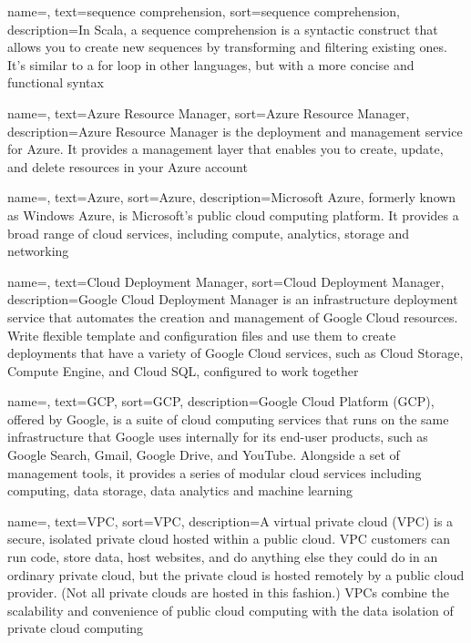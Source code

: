 {
    name=,
    text=sequence comprehension,
    sort=sequence comprehension,
    description={In Scala, a sequence comprehension is a syntactic construct that allows you to create new sequences by transforming and filtering existing ones. It's similar to a for loop in other languages, but with a more concise and functional syntax }
}

{
    name=,
    text=Azure Resource Manager,
    sort=Azure Resource Manager,
    description={Azure Resource Manager is the deployment and management service for Azure. It provides a management layer that enables you to create, update, and delete resources in your Azure account
    }
}

{
    name=,
    text=Azure,
    sort=Azure,
    description={Microsoft Azure, formerly known as Windows Azure, is Microsoft's public cloud computing platform. It provides a broad range of cloud services, including compute, analytics, storage and networking}
}

{
    name=,
    text=Cloud Deployment Manager,
    sort=Cloud Deployment Manager,
    description={Google Cloud Deployment Manager is an infrastructure deployment service that automates the creation and management of Google Cloud resources. Write flexible template and configuration files and use them to create deployments that have a variety of Google Cloud services, such as Cloud Storage, Compute Engine, and Cloud SQL, configured to work together}
}

{
    name=,
    text=GCP,
    sort=GCP,
    description={Google Cloud Platform (GCP), offered by Google, is a suite of cloud computing services that runs on the same infrastructure that Google uses internally for its end-user products, such as Google Search, Gmail, Google Drive, and YouTube. Alongside a set of management tools, it provides a series of modular cloud services including computing, data storage, data analytics and machine learning}
}

{
    name=,
    text=VPC,
    sort=VPC,
    description={A virtual private cloud (VPC) is a secure, isolated private cloud hosted within a public cloud. VPC customers can run code, store data, host websites, and do anything else they could do in an ordinary private cloud, but the private cloud is hosted remotely by a public cloud provider. (Not all private clouds are hosted in this fashion.) VPCs combine the scalability and convenience of public cloud computing with the data isolation of private cloud computing}
}


